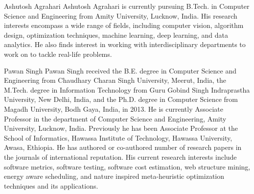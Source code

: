 \documentclass[10pt,journal,compsoc]{IEEEtran}
\begin{document}
% 
\newpage
\begin{IEEEbiography}{Ashutosh Agrahari}
Ashutosh Agrahari is currently pursuing B.Tech. in Computer Science and Engineering from Amity University, Lucknow, India. His research interests encompass a wide range of fields, including computer vision, algorithm design, optimization techniques, machine learning, deep learning, and data analytics. He also finds interest in working with interdisciplinary departments to work on to tackle real-life problems.
\end{IEEEbiography}

\begin{IEEEbiography}{Pawan Singh}
	Pawan Singh received the B.E. degree in Computer Science and Engineering from Chaudhary Charan Singh University, Meerut, India, the M.Tech. degree in Information Technology from Guru Gobind Singh Indraprastha University, New Delhi, India, and the Ph.D. degree in Computer Science from Magadh University, Bodh Gaya, India, in 2013. He is currently Associate Professor in the department of Computer Science and Engineering, Amity University, Lucknow, India. Previously he has been Associate Professor at the School of Informatics, Hawassa Institute of Technology, Hawassa University, Awasa, Ethiopia. He has authored or co-authored number of research papers in the journals of international reputation. His current research interests include software metrics, software testing, software cost estimation, web structure mining, energy aware scheduling, and nature inspired meta-heuristic optimization techniques and its applications.
\end{IEEEbiography}
\end{document}
